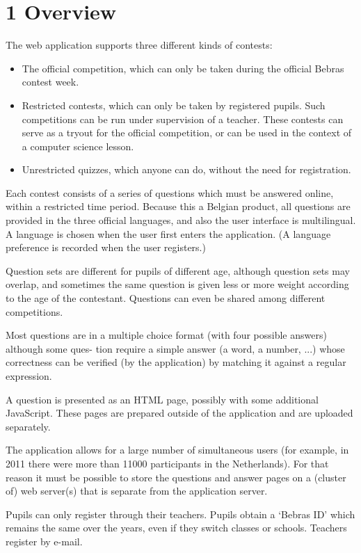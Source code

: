
\section*{1 Overview}

The web application supports three different kinds of contests:

\begin{itemize}
    \item The official competition, which can only be taken during the official
        Bebras contest week.
    \item Restricted contests, which can only be taken by registered pupils.
        Such competitions can be run under supervision of a teacher. These
        contests can serve as a tryout for the official competition, or can be
        used in the context of a computer science lesson.
    \item Unrestricted quizzes, which anyone can do, without the need for
        registration.
\end{itemize}

Each contest consists of a series of questions which must be answered online,
within a restricted time period. Because this a Belgian product, all questions
are provided in the three official languages, and also the user interface is
multilingual. A language is chosen when the user first enters the application.
(A language preference is recorded when the user registers.)

Question sets are different for pupils of different age, although question sets
may overlap, and sometimes the same question is given less or more weight
according to the age of the contestant.  Questions can even be shared among
different competitions.

Most questions are in a multiple choice format (with four possible answers)
although some ques- tion require a simple answer (a word, a number, ...) whose
correctness can be verified (by the application) by matching it against a
regular expression.

A question is presented as an HTML page, possibly with some additional
JavaScript. These pages are prepared outside of the application and are
uploaded separately.

The application allows for a large number of simultaneous users (for example,
in 2011 there were more than 11000 participants in the Netherlands). For that
reason it must be possible to store the questions and answer pages on a
(cluster of) web server(s) that is separate from the application server.

Pupils can only register through their teachers. Pupils obtain a `Bebras ID'
which remains the same over the years, even if they switch classes or schools.
Teachers register by e-mail.

